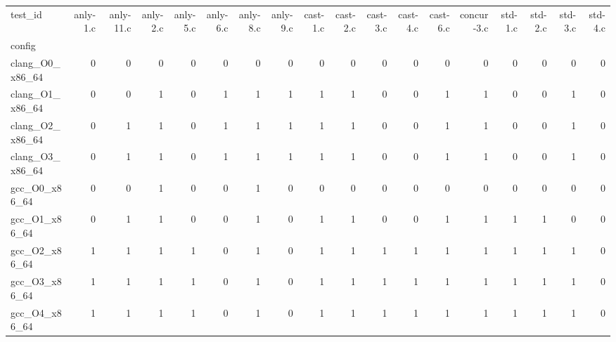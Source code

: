 \begin{tabular}{lrrrrrrrrrrrrrrrrr}
\toprule
test_id & anly-1.c & anly-11.c & anly-2.c & anly-5.c & anly-6.c & anly-8.c & anly-9.c & cast-1.c & cast-2.c & cast-3.c & cast-4.c & cast-6.c & concur-3.c & std-1.c & std-2.c & std-3.c & std-4.c \\
config &  &  &  &  &  &  &  &  &  &  &  &  &  &  &  &  &  \\
\midrule
clang_O0_x86_64 & 0 & 0 & 0 & 0 & 0 & 0 & 0 & 0 & 0 & 0 & 0 & 0 & 0 & 0 & 0 & 0 & 0 \\
clang_O1_x86_64 & 0 & 0 & 1 & 0 & 1 & 1 & 1 & 1 & 1 & 0 & 0 & 1 & 1 & 0 & 0 & 1 & 0 \\
clang_O2_x86_64 & 0 & 1 & 1 & 0 & 1 & 1 & 1 & 1 & 1 & 0 & 0 & 1 & 1 & 0 & 0 & 1 & 0 \\
clang_O3_x86_64 & 0 & 1 & 1 & 0 & 1 & 1 & 1 & 1 & 1 & 0 & 0 & 1 & 1 & 0 & 0 & 1 & 0 \\
gcc_O0_x86_64 & 0 & 0 & 1 & 0 & 0 & 1 & 0 & 0 & 0 & 0 & 0 & 0 & 0 & 0 & 0 & 0 & 0 \\
gcc_O1_x86_64 & 0 & 1 & 1 & 0 & 0 & 1 & 0 & 1 & 1 & 0 & 0 & 1 & 1 & 1 & 1 & 0 & 0 \\
gcc_O2_x86_64 & 1 & 1 & 1 & 1 & 0 & 1 & 0 & 1 & 1 & 1 & 1 & 1 & 1 & 1 & 1 & 1 & 0 \\
gcc_O3_x86_64 & 1 & 1 & 1 & 1 & 0 & 1 & 0 & 1 & 1 & 1 & 1 & 1 & 1 & 1 & 1 & 1 & 0 \\
gcc_O4_x86_64 & 1 & 1 & 1 & 1 & 0 & 1 & 0 & 1 & 1 & 1 & 1 & 1 & 1 & 1 & 1 & 1 & 0 \\
\bottomrule
\end{tabular}
